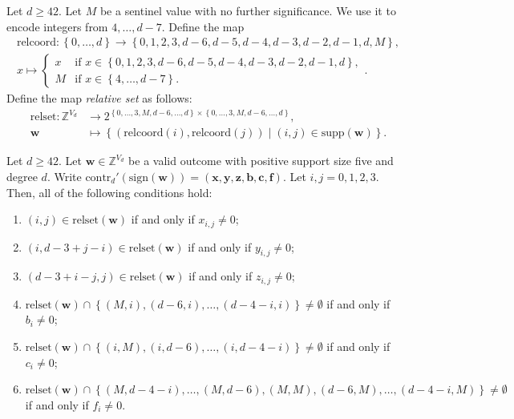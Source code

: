 \begin{definition}
    Let \( d \geq 42 \).
    Let \( M \) be a sentinel value with no further significance. We use it to encode integers from \( 4, \dots, d-7 \). Define the map 
    \begin{align*}
        \mathrm{relcoord}: \left\{ 0, \dots, d \right\} \to \left\{ 0,1,2,3,d-6,d-5,d-4,d-3,d-2,d-1,d,M \right\}, \\
        x \mapsto \begin{cases}
            x & \text{if } x \in \left\{ 0,1,2,3, d-6,d-5,d-4,d-3,d-2,d-1,d \right\}, \\
            M& \text{if } x \in \left\{ 4, \dots, d-7 \right\}.
        \end{cases}.
    \end{align*}
    Define the map \emph{relative set} as follows:
    \begin{align*}
        \mathrm{relset}: \mathbb{Z}^{V_d} &\to 2^{\left\{ 0, \dots, 3, M, d-6, \dots, d \right\} \times \left\{ 0, \dots, 3, M, d-6, \dots, d \right\}}, \\
        \mathbf{w} &\mapsto \left\{ (\mathrm{relcoord}(i), \mathrm{relcoord}(j)) \mid (i,j) \in \mathrm{supp}(\mathbf{w}) \right\}.
    \end{align*}
\end{definition}

\begin{proposition}\label{prop:iewjri3j3234212121112}
    Let \( d \geq 42 \). Let \( \mathbf{w} \in \mathbb{Z}^{V_d} \) be a valid outcome with positive support size five and degree \( d \). Write \( \mathrm{contr}_d'(\mathrm{sign}(\mathbf{w})) = (\mathbf{x},\mathbf{y},\mathbf{z},\mathbf{b},\mathbf{c},\mathbf{f} ) \). Let \( i,j = 0,1,2,3 \). Then, all of the following conditions hold:
    \begin{enumerate}
        \item \( (i,j) \in \mathrm{relset}(\mathbf{w}) \) if and only if \( x_{i,j} \neq 0 \);
        \item \( (i, d-3+j-i) \in \mathrm{relset}(\mathbf{w}) \) if and only if \( y_{i,j} \neq 0 \);
        \item \( (d-3+i-j,j) \in \mathrm{relset}(\mathbf{w}) \) if and only if \( z_{i,j} \neq 0 \);
        \item \( \mathrm{relset}(\mathbf{w}) \cap \left\{ (M,i), (d-6, i), \dots, (d-4-i, i) \right\} \neq \emptyset \) if and only if \( b_i \neq 0 \);
        \item \( \mathrm{relset}(\mathbf{w}) \cap \left\{ (i,M), (i, d-6), \dots, (i,d-4-i) \right\} \neq \emptyset \) if and only if \( c_i \neq 0 \);
        \item \( \mathrm{relset}(\mathbf{w}) \cap \left\{ (M, d-4-i), \dots, (M, d-6), (M,M), (d-6, M), \dots, (d-4-i, M) \right\} \neq \emptyset \) if and only if \( f_i \neq 0 \).
    \end{enumerate}
\end{proposition}

